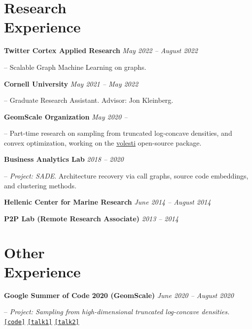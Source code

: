 \documentclass[margin]{res}
\newcommand{\specialurl}[2]{\href {#2} {\texttt{[#1]}}}
\newcommand{\code}[1]{\specialurl {code} {#1}}
\begin{document}
\begin{resume}
\begin{compactenum}
\end{compactenum}



\section{Research \\ Experience}

\textbf{Twitter Cortex Applied Research} \hfill \emph{May 2022 -- August 2022}
\begin{compactitem}
\item[--] Scalable Graph Machine Learning on graphs. 
\end{compactitem}

\textbf{Cornell University} \hfill \emph{May 2021 -- May 2022}
\begin{compactitem}
	\item[--] Graduate Research Assistant. Advisor: Jon Kleinberg.	
\end{compactitem}


\textbf{GeomScale Organization} \hfill \emph{May 2020 --}

\begin{compactitem}
	\item[--] Part-time research on sampling from truncated log-concave densities, and convex optimization, working on the \href{https://github.com/GeomScale/volesti}{volesti} open-source package.
\end{compactitem}



\textbf{Business Analytics Lab} \hfill \emph{2018 -- 2020}
\begin{compactitem}
\item[--] \emph{Project: SADE}. Architecture recovery via call graphs, source code embeddings, and clustering methods.
\end{compactitem}

\textbf{Hellenic Center for Marine Research} \hfill \emph{June 2014 -- August 2014}

\textbf{P2P Lab (Remote Research Associate)} \hfill \emph{2013 -- 2014}

 
\section{Other \\ Experience}
\textbf{Google Summer of Code 2020 (GeomScale)}  \hfill \emph{June 2020 -- August 2020}
\begin{compactitem}
\item[--] \emph{Project: Sampling from high-dimensional truncated log-concave densities.} \\ \code{https://GeomScale/volesti} \specialurl{talk1}{https://www.youtube.com/watch?v=P7YfC8Nn6sY} \specialurl{talk2}{https://www.cs.utah.edu/~jeffp/WaGoML/index.html}
\end{compactitem}


\end{resume}
\end{document}
